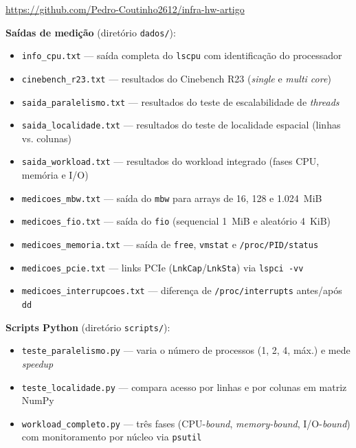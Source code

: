 \documentclass[12pt]{article}
\begin{document}
\begin{center}
\url{https://github.com/Pedro-Coutinho2612/infra-hw-artigo}
\end{center}

\noindent\textbf{Saídas de medição} (diretório \texttt{dados/}):

\begin{itemize}
  \item \texttt{info\_cpu.txt} --- saída completa do \texttt{lscpu} com identificação do processador
  \item \texttt{cinebench\_r23.txt} --- resultados do Cinebench R23 (\textit{single} e \textit{multi core})
  \item \texttt{saida\_paralelismo.txt} --- resultados do teste de escalabilidade de \textit{threads}
  \item \texttt{saida\_localidade.txt} --- resultados do teste de localidade espacial (linhas vs. colunas)
  \item \texttt{saida\_workload.txt} --- resultados do workload integrado (fases CPU, memória e I/O)
  \item \texttt{medicoes\_mbw.txt} --- saída do \texttt{mbw} para arrays de 16, 128 e 1.024~MiB
  \item \texttt{medicoes\_fio.txt} --- saída do \texttt{fio} (sequencial 1~MiB e aleatório 4~KiB)
  \item \texttt{medicoes\_memoria.txt} --- saída de \texttt{free}, \texttt{vmstat} e \texttt{/proc/PID/status}
  \item \texttt{medicoes\_pcie.txt} --- links PCIe (\texttt{LnkCap}/\texttt{LnkSta}) via \texttt{lspci -vv}
  \item \texttt{medicoes\_interrupcoes.txt} --- diferença de \texttt{/proc/interrupts} antes/após \texttt{dd}
\end{itemize}

\noindent\textbf{Scripts Python} (diretório \texttt{scripts/}):

\begin{itemize}
  \item \texttt{teste\_paralelismo.py} --- varia o número de processos (1, 2, 4, máx.) e mede \textit{speedup}
  \item \texttt{teste\_localidade.py} --- compara acesso por linhas e por colunas em matriz NumPy
  \item \texttt{workload\_completo.py} --- três fases (CPU-\textit{bound}, \textit{memory-bound}, I/O-\textit{bound}) com monitoramento por núcleo via \texttt{psutil}
\end{itemize}



\end{document}
